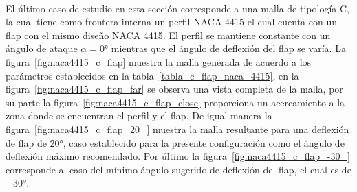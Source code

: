 \documentclass[letterpaper, openright, 12pt]{book}
\begin{document}
    \paragraph*{}
    El último caso de estudio en esta sección corresponde a una malla de
    tipología C, la cual tiene como frontera interna un perfil NACA 4415 el
    cual cuenta con un flap con el mismo diseño NACA 4415. El perfil se
    mantiene constante con un ángulo de ataque $\alpha = 0\si{\degree}$
    mientras que el ángulo de deflexión del flap se varía. La
    figura~\ref{fig:naca4415_c_flap} muestra la malla generada de acuerdo a los
    parámetros establecidos en la tabla~\ref{tabla_c_flap_naca_4415}, en la
    figura~\ref{fig:naca4415_c_flap_far} se observa una vista completa de la
    malla, por su parte la figura~\ref{fig:naca4415_c_flap_close} proporciona
    un acercamiento a la zona donde se encuentran el perfil y el flap. De igual
    manera la figura~\ref{fig:naca4415_c_flap_20_} muestra la malla resultante
    para una deflexión de flap de $20\si{\degree}$, caso establecido para la
    presente configuración como el ángulo de deflexión máximo recomendado.
    Por último la figura~\ref{fig:naca4415_c_flap_-30_} corresponde al caso
    del mínimo ángulo sugerido de deflexión del flap, el cual es de
    $-30\si{\degree}$.
\end{document}
